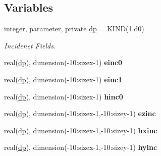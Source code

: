 \subsection*{Variables}
\begin{DoxyCompactItemize}
\item 
integer, parameter, private \hyperlink{namespacetfsf_add0ca7d8e64b873d4cded22defee1fdb}{dp} = K\+I\+N\+D(1.d0)
\begin{DoxyCompactList}\small\item\em Incidenet Fields. \end{DoxyCompactList}\item 
\hypertarget{namespacetfsf_a9788c6209c44165cfbb67a6460a84e3c}{}real(\hyperlink{namespacetfsf_add0ca7d8e64b873d4cded22defee1fdb}{dp}), dimension(-\/10\+:sizex-\/1) {\bfseries einc0}\label{namespacetfsf_a9788c6209c44165cfbb67a6460a84e3c}

\item 
\hypertarget{namespacetfsf_a50fdca1dbdb94c680e435765135a7ec6}{}real(\hyperlink{namespacetfsf_add0ca7d8e64b873d4cded22defee1fdb}{dp}), dimension(-\/10\+:sizex-\/1) {\bfseries einc1}\label{namespacetfsf_a50fdca1dbdb94c680e435765135a7ec6}

\item 
\hypertarget{namespacetfsf_ac5a289f90633b1edd9b696f385659256}{}real(\hyperlink{namespacetfsf_add0ca7d8e64b873d4cded22defee1fdb}{dp}), dimension(-\/10\+:sizex-\/1) {\bfseries hinc0}\label{namespacetfsf_ac5a289f90633b1edd9b696f385659256}

\item 
\hypertarget{namespacetfsf_aa5aa7fb7e5d93697584ee077a4e6d0a3}{}real(\hyperlink{namespacetfsf_add0ca7d8e64b873d4cded22defee1fdb}{dp}), dimension(-\/10\+:sizex-\/1,-\/10\+:sizey-\/1) {\bfseries ezinc}\label{namespacetfsf_aa5aa7fb7e5d93697584ee077a4e6d0a3}

\item 
\hypertarget{namespacetfsf_a27c057dfe3b664bff7461d2473d04f9a}{}real(\hyperlink{namespacetfsf_add0ca7d8e64b873d4cded22defee1fdb}{dp}), dimension(-\/10\+:sizex-\/1,-\/10\+:sizey-\/1) {\bfseries hxinc}\label{namespacetfsf_a27c057dfe3b664bff7461d2473d04f9a}

\item 
\hypertarget{namespacetfsf_adadc5684e0c3fd28a0924a67d908675f}{}real(\hyperlink{namespacetfsf_add0ca7d8e64b873d4cded22defee1fdb}{dp}), dimension(-\/10\+:sizex-\/1,-\/10\+:sizey-\/1) {\bfseries hyinc}\label{namespacetfsf_adadc5684e0c3fd28a0924a67d908675f}

\end{DoxyCompactItemize}


